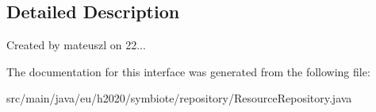 \subsection{Detailed Description}
Created by mateuszl on 22... 

The documentation for this interface was generated from the following file\+:\begin{DoxyCompactItemize}
\item 
src/main/java/eu/h2020/symbiote/repository/Resource\+Repository.\+java\end{DoxyCompactItemize}
